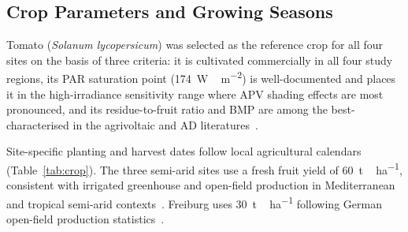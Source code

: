 \subsection{Crop Parameters and Growing Seasons}
\label{sec:crop}

\hspace{1cm}Tomato (\textit{Solanum lycopersicum}) was selected as the
reference crop for all four sites on the basis of three criteria: it is
cultivated commercially in all four study regions, its PAR saturation
point (\SI{174}{W\,m^{-2}}) is well-documented and places it in the
high-irradiance sensitivity range where APV shading effects are most
pronounced, and its residue-to-fruit ratio and BMP are among the
best-characterised in the agrivoltaic and AD
literatures~\citep{mohammedi2023, lallement2023, feng2013}.

Site-specific planting and harvest dates follow local agricultural
calendars (Table~\ref{tab:crop}). The three semi-arid sites use a fresh
fruit yield of \SI{60}{t\,ha^{-1}}, consistent with irrigated greenhouse
and open-field production in Mediterranean and tropical semi-arid
contexts~\citep{mohammedi2023}. Freiburg uses \SI{30}{t\,ha^{-1}}
following German open-field production statistics~\citep{dlg2023}.

